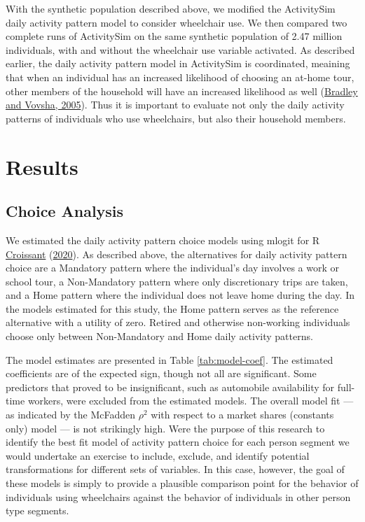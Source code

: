 \documentclass[3p, authoryear, review]{elsarticle} %
\begin{document}
With the synthetic population described above, we modified the ActivitySim
daily activity pattern model to consider wheelchair use. We then compared two
complete runs of ActivitySim on the same synthetic population of 2.47 million
individuals, with and without the wheelchair use variable activated. As described
earlier, the daily activity pattern model in ActivitySim is coordinated, meaining
that when an individual has an increased likelihood of choosing an at-home tour,
other members of the household will have an increased likelihood as well (\protect\hyperlink{ref-Bradley2005}{Bradley and Vovsha, 2005}).
Thus it is important to evaluate not only the daily activity patterns of
individuals who use wheelchairs, but also their household members.

\hypertarget{results}{%
\section{Results}\label{results}}

\hypertarget{choice-analysis}{%
\subsection{Choice Analysis}\label{choice-analysis}}

We estimated the daily activity pattern choice models using mlogit for R
\protect\hyperlink{ref-mlogit2020}{Croissant} (\protect\hyperlink{ref-mlogit2020}{2020}). As described above, the alternatives for daily activity
pattern choice are a Mandatory pattern where the individual's day involves a
work or school tour, a Non-Mandatory pattern where only discretionary trips are
taken, and a Home pattern where the individual does not leave home during the
day. In the models estimated for this study, the Home pattern serves as the
reference alternative with a utility of zero. Retired and otherwise non-working
individuals choose only between Non-Mandatory and Home daily activity patterns.

The model estimates are presented in
Table \ref{tab:model-coef}.
The estimated coefficients are of the expected sign, though not all are significant.
Some predictors that proved to be insignificant, such as automobile availability
for full-time workers, were excluded from the estimated models.
The overall model fit --- as indicated by the McFadden \(\rho^2\) with respect to
a market shares (constants only) model --- is not strikingly high. Were the purpose
of this research to identify the best fit model of activity pattern choice for
each person segment we would undertake an exercise to include, exclude, and identify
potential transformations for different sets of variables. In this case, however,
the goal of these models is simply to provide a plausible comparison point for
the behavior of individuals using wheelchairs against the behavior of individuals
in other person type segments.
\end{document}
